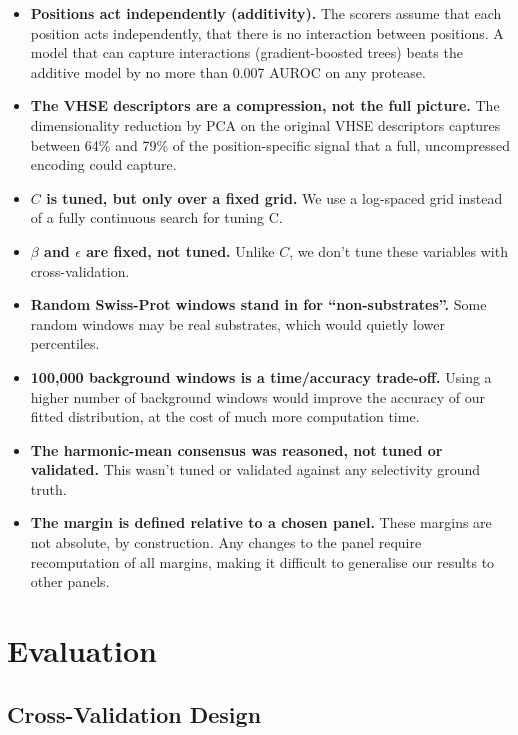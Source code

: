 \documentclass[10pt,a4paper]{article}
\numberwithin{equation}{section}
\newenvironment{assump}{\small}{\smallskip}
\begin{document}
\begin{assump}
\begin{itemize}[leftmargin=*]
\item \textbf{Positions act independently (additivity).} The scorers assume that each position acts independently, that there is no interaction between positions. A model that can capture interactions (gradient-boosted trees) beats the additive model by no more than 0.007 AUROC on any protease.
\item \textbf{The VHSE descriptors are a compression, not the full picture.} The dimensionality reduction by PCA on the original VHSE descriptors captures between 64\% and 79\% of the position-specific signal that a full, uncompressed encoding could capture.
\item \textbf{$C$ is tuned, but only over a fixed grid.} We use a log-spaced grid instead of a fully continuous search for tuning C.
\item \textbf{$\beta$ and $\epsilon$ are fixed, not tuned.} Unlike $C$, we don't tune these variables with cross-validation.
\item \textbf{Random Swiss-Prot windows stand in for ``non-substrates''.} Some random windows may be real substrates, which would quietly lower percentiles.
\item \textbf{100,000 background windows is a time/accuracy trade-off.} Using a higher number of background windows would improve the accuracy of our fitted distribution, at the cost of much more computation time.
\item \textbf{The harmonic-mean consensus was reasoned, not tuned or validated.} This wasn't tuned or validated against any selectivity ground truth.
\item \textbf{The margin is defined relative to a chosen panel.} These margins are not absolute, by construction. Any changes to the panel require recomputation of all margins, making it difficult to generalise our results to other panels.
\end{itemize}
\end{assump}


\section{Evaluation}
\label{sec:evaluation}

\subsection{Cross-Validation Design}
\end{document}
